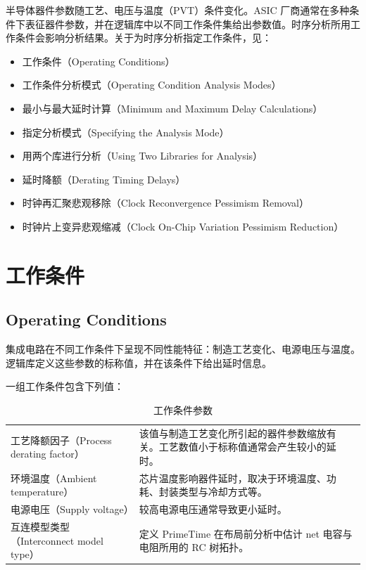 \label{chap:opcond}

半导体器件参数随工艺、电压与温度（PVT）条件变化。ASIC 厂商通常在多种条件下表征器件参数，并在逻辑库中以不同工作条件集给出参数值。时序分析所用工作条件会影响分析结果。关于为时序分析指定工作条件，见：
\begin{itemize}
  \item 工作条件（Operating Conditions）
  \item 工作条件分析模式（Operating Condition Analysis Modes）
  \item 最小与最大延时计算（Minimum and Maximum Delay Calculations）
  \item 指定分析模式（Specifying the Analysis Mode）
  \item 用两个库进行分析（Using Two Libraries for Analysis）
  \item 延时降额（Derating Timing Delays）
  \item 时钟再汇聚悲观移除（Clock Reconvergence Pessimism Removal）
  \item 时钟片上变异悲观缩减（Clock On-Chip Variation Pessimism Reduction）
\end{itemize}

\section{工作条件}
\subsection*{Operating Conditions}

集成电路在不同工作条件下呈现不同性能特征：制造工艺变化、电源电压与温度。逻辑库定义这些参数的标称值，并在该条件下给出延时信息。

一组工作条件包含下列值：

\begin{table}[htbp]
\centering
\caption{工作条件参数}
\begin{tabular}{|L{3.2cm}|L{9.5cm}|}
\hline
{} &  \\
\hline
工艺降额因子（Process derating factor） & 该值与制造工艺变化所引起的器件参数缩放有关。工艺数值小于标称值通常会产生较小的延时。 \\
环境温度（Ambient temperature） & 芯片温度影响器件延时，取决于环境温度、功耗、封装类型与冷却方式等。 \\
电源电压（Supply voltage） & 较高电源电压通常导致更小延时。 \\
互连模型类型（Interconnect model type） & 定义 PrimeTime 在布局前分析中估计 net 电容与电阻所用的 RC 树拓扑。 \\
\hline
\end{tabular}
\end{table}

